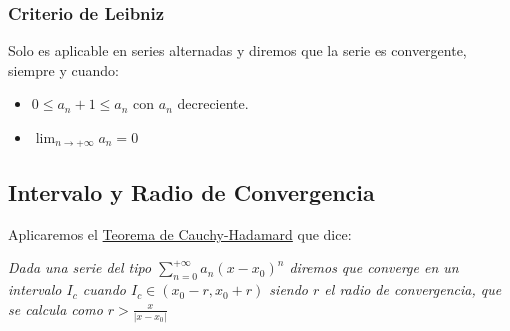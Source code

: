 \subsubsection{Criterio de Leibniz}
 Solo es aplicable en series alternadas y diremos que la serie es convergente, siempre y cuando:
\begin{itemize}
        \item \(0\leq a_n+1 \leq a_n\) con \(a_n\) decreciente.
        \item  \(\lim_{n\rightarrow +\infty} a_n=0\)
\end{itemize}
\subsection{Intervalo y Radio de Convergencia}
 Aplicaremos el \underline{Teorema de Cauchy-Hadamard} que dice: \par  \textit{Dada una serie del tipo \(\sum^{+\infty}_{n=0}a_n(x-x_0)^n\) diremos que converge en un intervalo \(I_c\) cuando \(I_c \in (x_0 - r, x_0 + r)\) siendo \(r\) el radio de convergencia, que se calcula como \(r > \frac{x}{|x- x_0|}\)}